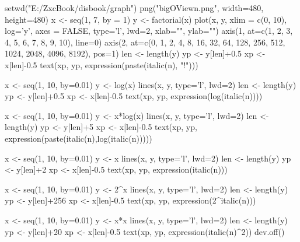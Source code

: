 setwd("E:/ZxcBook/disbook/graph")
png("bigOViewn.png", width=480, height=480)
x <- seq(1, 7, by = 1)
y <- factorial(x)
plot(x, y,  xlim = c(0, 10), log='y', axes = FALSE, type='l', lwd=2, xlab="", ylab="")
axis(1, at=c(1, 2, 3, 4, 5, 6, 7, 8, 9, 10), line=0)
axis(2, at=c(0, 1, 2, 4, 8, 16, 32, 64, 128, 256, 512, 1024, 2048, 4096, 8192), pos=1)
len <- length(y)
yp <- y[len]+0.5
xp <- x[len]-0.5
text(xp, yp, expression(paste(italic(n), "!")))

x <- seq(1, 10, by=0.01)
y <- log(x)
lines(x, y, type='l', lwd=2)
len <- length(y)
yp <- y[len]+0.5
xp <- x[len]-0.5
text(xp, yp, expression(log(italic(n))))

x <- seq(1, 10, by=0.01)
y <- x*log(x)
lines(x, y, type='l', lwd=2)
len <- length(y)
yp <- y[len]+5
xp <- x[len]-0.5
text(xp, yp, expression(paste(italic(n),log(italic(n)))))


x <- seq(1, 10, by=0.01)
y <- x
lines(x, y, type='l', lwd=2)
len <- length(y)
yp <- y[len]+2
xp <- x[len]-0.5
text(xp, yp, expression(italic(n)))

x <- seq(1, 10, by=0.01)
y <- 2^x
lines(x, y, type='l', lwd=2)
len <- length(y)
yp <- y[len]+256
xp <- x[len]-0.5
text(xp, yp, expression(2^italic(n)))

x <- seq(1, 10, by=0.01)
y <- x*x
lines(x, y, type='l', lwd=2)
len <- length(y)
yp <- y[len]+20
xp <- x[len]-0.5
text(xp, yp, expression(italic(n)^2))
dev.off()
